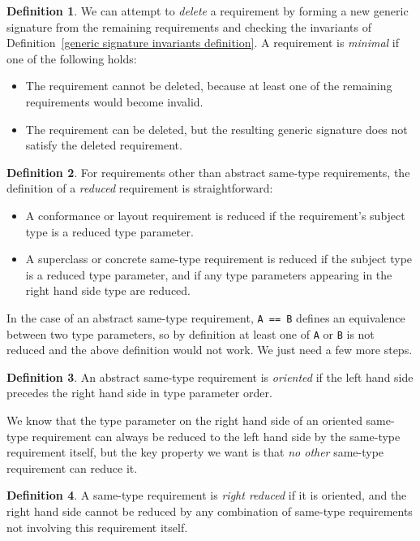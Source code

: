 \documentclass[a4paper,headsepline,bibliography=totoc,toc=flat,fleqn,twoside=semi]{scrbook}
\theoremstyle{definition}
\newtheorem{definition}{Definition}[chapter]
\theoremstyle{definition}
\theoremstyle{definition}
\begin{document}
\begin{definition} We can attempt to \emph{delete} a requirement by forming a new generic signature from the remaining requirements and checking the invariants of Definition~\ref{generic signature invariants definition}. A requirement is \emph{minimal} if one of the following holds:
\begin{itemize}
\item The requirement cannot be deleted, because at least one of the remaining requirements would become invalid.
\item The requirement can be deleted, but the resulting generic signature does not satisfy the deleted requirement.
\end{itemize}
\end{definition}

\begin{definition}
For requirements other than abstract same-type requirements, the definition of a \emph{reduced} requirement is straightforward:
\begin{itemize}
\item A conformance or layout requirement is reduced if the requirement's subject type is a reduced type parameter.
\item A superclass or concrete same-type requirement is reduced if the subject type is a reduced type parameter, and if any type parameters appearing in the right hand side type are reduced.
\end{itemize}
 \end{definition}
In the case of an abstract same-type requirement, \texttt{A == B} defines an equivalence between two type parameters, so by definition at least one of \texttt{A} or \texttt{B} is not reduced and the above definition would not work. We just need a few more steps.
\begin{definition}
An abstract same-type requirement is \emph{oriented} if the left hand side precedes the right hand side in type parameter order.
\end{definition}
We know that the type parameter on the right hand side of an oriented same-type requirement can always be reduced to the left hand side by the same-type requirement itself, but the key property we want is that \emph{no other} same-type requirement can reduce it.
\begin{definition} A same-type requirement is \emph{right reduced} if it is oriented, and the right hand side cannot be reduced by any combination of same-type requirements not involving this requirement itself.
\end{definition}
\end{document}
